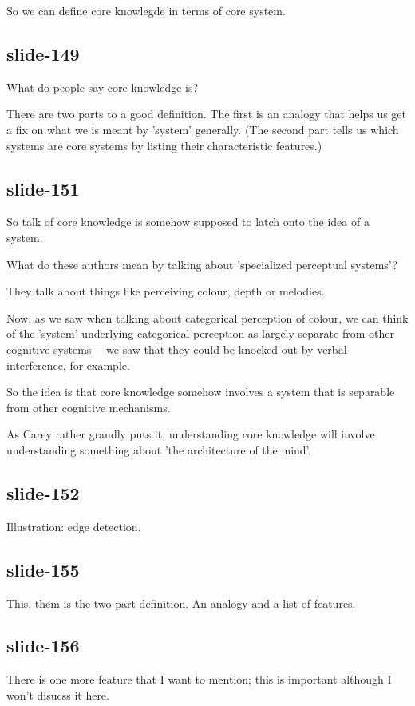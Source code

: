 \documentclass[12pt,\papersize]{extarticle}
\begin{document}
So we can define core knowlegde in terms of core system.
 
\subsection{slide-149}
What do people say core knowledge is?
 
There are two parts to a good definition.  The first is an analogy that helps us get a fix on what we is meant by 'system' generally.  (The second part tells us which systems are core systems by listing their characteristic features.)
 
\subsection{slide-151}
So talk of core knowledge is somehow supposed to latch onto the idea of a system.
 
What do these authors mean by talking about 'specialized perceptual systems'?
 
They talk about things like perceiving colour, depth or melodies.
 
Now, as we saw when talking about categorical perception of colour, we can think of the 'system' underlying categorical perception as largely separate from other cognitive systems--- we saw that they could be knocked out by verbal interference, for example.
 
So the idea is that core knowledge somehow involves a system that is separable from other cognitive mechanisms.
 
As Carey rather grandly puts it, understanding core knowledge will involve understanding something about 'the architecture of the mind'.
 
\subsection{slide-152}
Illustration: edge detection.
 
\subsection{slide-155}
 
This, them is the two part definition.  An analogy and a list of features.
 
\subsection{slide-156}
There is one more feature that I want to mention; this is important although I won't disucss it here.
 
\end{document}
